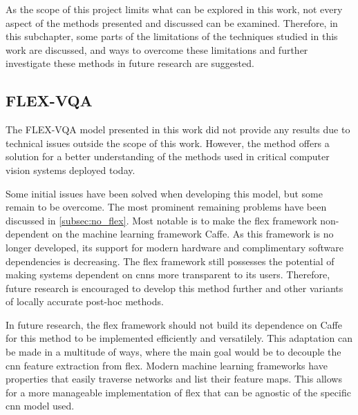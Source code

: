 \begin{comment}
    Your thesis will NOT answer everything. Still, it is important that you here show that you are aware of that and list various things that could be done to follow up on your work. What would be the next steps? Next experiments? Maybe link this up against section 1.3 - scope and limitations.
\end{comment}

As the scope of this project limits what can be explored in this work, not every aspect of the methods presented and discussed can be examined. Therefore, in this subchapter, some parts of the limitations of the techniques studied in this work are discussed, and ways to overcome these limitations and further investigate these methods in future research are suggested.

\subsection{FLEX-VQA}
    The FLEX-VQA model presented in this work did not provide any results due to technical issues outside the scope of this work. However, the method offers a solution for a better understanding of the methods used in critical computer vision systems deployed today.

    Some initial issues have been solved when developing this model, but some remain to be overcome. The most prominent remaining problems have been discussed in  \autoref{subsec:no_flex}. Most notable is to make the \gls{flex} framework non-dependent on the machine learning framework Caffe. As this framework is no longer developed, its support for modern hardware and complimentary software dependencies is decreasing. The \gls{flex} framework still possesses the potential of making systems dependent on \glspl{cnn} more transparent to its users. Therefore, future research is encouraged to develop this method further and other variants of locally accurate post-hoc methods. 

    In future research, the \gls{flex} framework should not build its dependence on Caffe for this method to be implemented efficiently and versatilely. 
    This adaptation can be made in a multitude of ways, where the main goal would be to decouple the \gls{cnn} feature extraction from \gls{flex}. Modern machine learning frameworks have properties that easily traverse networks and list their feature maps. This allows for a more manageable implementation of \gls{flex} that can be agnostic of the specific \gls{cnn} model used. 


